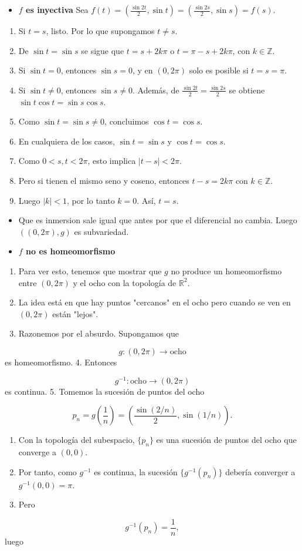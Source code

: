 \begin{bookproof}{}
\begin{itemize}
\item \textbf{$f$ es inyectiva} Sea $f(t)=\left(\frac{\sin 2t}{2},\sin t\right)=\left(\frac{\sin 2s}{2},\sin s\right)=f(s)$.
\end{itemize}
\begin{enumerate}
\item Si $t=s$, listo. Por lo que supongamos $t\neq s$.
\item De $\sin t=\sin s$ se sigue que $t=s+2k\pi$ o $t=\pi-s+2k\pi$, con $k\in\mathbb Z$.
\item Si $\sin t=0$, entonces $\sin s=0$, y en $(0,2\pi)$ solo es posible si $t=s=\pi$.
\item Si $\sin t\neq0$, entonces $\sin s\neq0$. Además, de $\frac{\sin 2t}{2}=\frac{\sin 2s}{2}$ se obtiene $\sin t\cos t=\sin s\cos s$.
\item Como $\sin t=\sin s\neq0$, concluimos $\cos t=\cos s$.
\item En cualquiera de los casos, $\sin t=\sin s$ y $\cos t=\cos s$.
\item Como $0<s,t<2\pi$, esto implica $|t-s|<2\pi$.
\item Pero si tienen el mismo seno y coseno, entonces $t-s=2k\pi$ con $k\in\mathbb Z$.
\item Luego $|k|<1$, por lo tanto $k=0$. Así, $t=s$.
\end{enumerate}
\begin{itemize}
\item Que es inmersion sale igual que antes por que el diferencial no cambia. Luego $((0,2\pi),g)$ es subvariedad.
\item \textbf{$f$ no es homeomorfismo}
\end{itemize}
\begin{enumerate}
\item Para ver esto, tenemos que mostrar que $g$ no produce un homeomorfismo entre $(0,2\pi)$ y el ocho con la topología de $\mathbb R^2$.
\item La idea está en que hay puntos "cercanos" en el ocho pero cuando se ven en $(0,2\pi)$ están "lejos".
\item Razonemos por el absurdo. Supongamos que
\end{enumerate}
\[
g:(0,2\pi)\to\text{ocho}
\]
es homeomorfismo. 4. Entonces

\[
g^{-1}:\text{ocho}\to(0,2\pi)
\]
es continua. 5. Tomemos la sucesión de puntos del ocho

\[
p_n=g\left(\frac1n\right)=\left(\frac{\sin(2/n)}{2},\sin(1/n)\right).
\]
\begin{enumerate}[start=6]
\item Con la topología del subespacio, $\{p_n\}$ es una sucesión de puntos del ocho que converge a $(0,0)$.
\item Por tanto, como $g^{-1}$ es continua, la sucesión $\{g^{-1}(p_n)\}$ debería converger a $g^{-1}(0,0)=\pi$.
\item Pero
\end{enumerate}
\[
g^{-1}(p_n)=\frac1n,
\]
luego


\end{bookproof}
